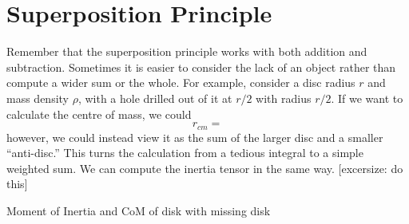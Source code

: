 \section{Superposition Principle}

Remember that the superposition principle works with both addition and subtraction. Some\-times it is easier to consider the lack of an object rather than compute a wider sum or the whole. For example, consider a disc radius \(r\) and mass density \(\rho\), with a hole drilled out of it at \(r/2\) with radius \(r/2\). If we want to calculate the centre of mass, we could 
\[r_{cm} = \]
however, we could instead view it as the sum of the larger disc and a smaller ``anti-disc.'' This turns the calculation from a tedious integral to a simple weighted sum. We can compute the inertia tensor in the same way. [excersize: do this]

Moment of Inertia and CoM of disk with missing disk


